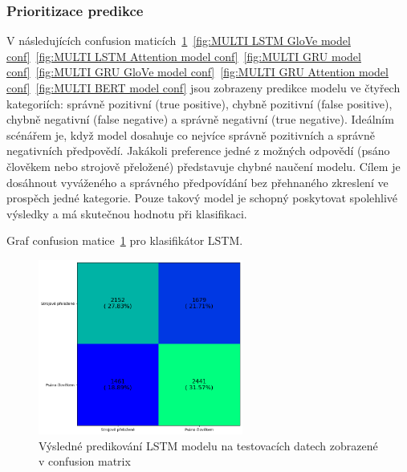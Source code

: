 \subsubsection{Prioritizace predikce}
V následujících confusion maticích~\ref{fig:MULTI LSTM model conf}~\ref{fig:MULTI LSTM GloVe model conf}~\ref{fig:MULTI LSTM Attention model conf}~\ref{fig:MULTI GRU model conf}~\ref{fig:MULTI GRU GloVe model conf}~\ref{fig:MULTI GRU Attention model conf}~\ref{fig:MULTI BERT model conf} jsou zobrazeny predikce modelu ve čtyřech kategoriích: správně pozitivní (true positive), chybně pozitivní (false positive), chybně negativní (false negative) a správně negativní (true negative).
Ideálním scénářem je, když model dosahuje co nejvíce správně pozitivních a správně negativních předpovědí.
Jakákoli preference jedné z možných odpovědí (psáno člověkem nebo strojově přeložené) představuje chybné naučení modelu.
Cílem je dosáhnout vyváženého a správného předpovídání bez přehnaného zkreslení ve prospěch jedné kategorie.
Pouze takový model je schopný poskytovat spolehlivé výsledky a má skutečnou hodnotu při klasifikaci.

Graf confusion matice~\ref{fig:MULTI LSTM model conf} pro klasifikátor LSTM.\@
\begin{figure}[H]
	\centering
	\includegraphics[width=0.6\textwidth]{Figures/MULTI_LSTM_conf.png}
	\caption{Výsledné predikování LSTM modelu na testovacích datech zobrazené v confusion matrix}\label{fig:MULTI LSTM model conf}
\end{figure}

